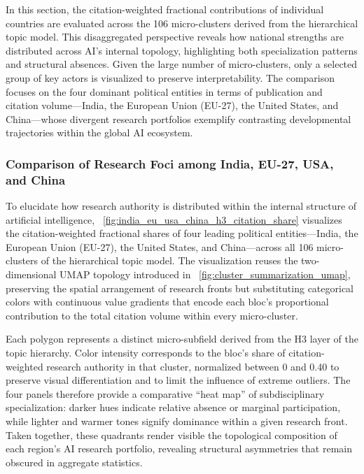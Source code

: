 \documentclass{article}
\begin{document}
In this section, the citation-weighted fractional contributions of individual countries are evaluated across the 106 micro-clusters derived from the hierarchical topic model. This disaggregated perspective reveals how national strengths are distributed across AI’s internal topology, highlighting both specialization patterns and structural absences. Given the large number of micro-clusters, only a selected group of key actors is visualized to preserve interpretability. The comparison focuses on the four dominant political entities in terms of publication and citation volume—India, the European Union (EU-27), the United States, and China—whose divergent research portfolios exemplify contrasting developmental trajectories within the global AI ecosystem.

\subsubsection{Comparison of Research Foci among India, EU-27, USA, and China}

To elucidate how research authority is distributed within the internal structure of artificial intelligence, \figurename~\ref{fig:india_eu_usa_china_h3_citation_share} visualizes the citation-weighted fractional shares of four leading political entities—India, the European Union (EU-27), the United States, and China—across all 106 micro-clusters of the hierarchical topic model. The visualization reuses the two-dimensional UMAP topology introduced in \figurename~\ref{fig:cluster_summarization_umap}, preserving the spatial arrangement of research fronts but substituting categorical colors with continuous value gradients that encode each bloc’s proportional contribution to the total citation volume within every micro-cluster.

Each polygon represents a distinct micro-subfield derived from the H3 layer of the topic hierarchy. Color intensity corresponds to the bloc’s share of citation-weighted research authority in that cluster, normalized between 0 and 0.40 to preserve visual differentiation and to limit the influence of extreme outliers. The four panels therefore provide a comparative “heat map” of subdisciplinary specialization: darker hues indicate relative absence or marginal participation, while lighter and warmer tones signify dominance within a given research front. Taken together, these quadrants render visible the topological composition of each region’s AI research portfolio, revealing structural asymmetries that remain obscured in aggregate statistics.
\end{document}
